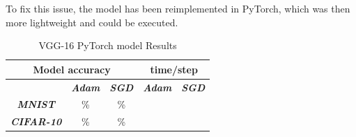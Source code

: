 \documentclass[conference]{IEEEtran}
\begin{document}
To fix this issue, the model has been reimplemented in PyTorch, which was then more lightweight and could be executed.

\begin{table}[!htbp]
    \caption{VGG-16 PyTorch model Results}
    \begin{center}
    \begin{tabular}{|c|c|c|c|c|}
    \cline{1-5} 
    \multicolumn{3}{|c|}{\textbf{Model accuracy}} & \multicolumn{2}{|c|}{\textbf{time/step}} \\
    \hline 
    \textit{} & \textbf{\textit{Adam}} & \textbf{\textit{SGD}} & \textbf{\textit{Adam}} & \textbf{\textit{SGD}} \\
    \hline
    \textbf{\textit{MNIST}} & \% & \% &  &  \\
    \hline
    \textbf{\textit{CIFAR-10}} & \% & \% &  &  \\
    \cline{1-5} 
    \end{tabular}
    \label{tab: VGG-16 PyTorch model accuracy}
    \end{center}
\end{table}
\end{document}
